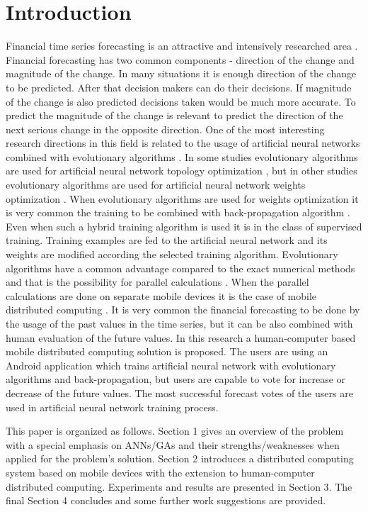 \documentclass[runningheads]{llncs}
\begin{document}
\section{Introduction} \label{Introduction}

Financial time series forecasting is an attractive and intensively researched area \cite{nava01}. Financial forecasting has two common components - direction of the change and magnitude of the change. In many situations it is enough direction of the change to be predicted. After that decision makers can do their decisions. If magnitude of the change is also predicted decisions taken would be much more accurate. To predict the magnitude of the change is relevant to predict the direction of the next serious change in the opposite direction. One of the most interesting research directions in this field is related to the usage of artificial neural networks combined with evolutionary algorithms \cite{zhang01}. In some studies evolutionary algorithms are used for artificial neural network topology optimization \cite{kapanova01}, but in other studies evolutionary algorithms are used for artificial neural network weights optimization \cite{aljarah01}. When evolutionary algorithms are used for weights optimization it is very common the training to be combined with back-propagation algorithm \cite{balabanov02}. Even when such a hybrid training algorithm is used it is in the class of supervised training. Training examples are fed to the artificial neural network and its weights are modified according the selected training algorithm. Evolutionary algorithms have a common advantage compared to the exact numerical methods and that is the possibility for parallel calculations \cite{altinoz01}. When the parallel calculations are done on separate mobile devices it is the case of mobile distributed computing \cite{sharma01}. It is very common the financial forecasting to be done by the usage of the past values in the time series, but it can be also combined with human evaluation of the future values. In this research a human-computer based mobile distributed computing solution is proposed. The users are using an Android application which trains artificial neural network with evolutionary algorithms and back-propagation, but users are capable to vote for increase or decrease of the future values. The most successful forecast votes of the users are used in artificial neural network training process.

This paper is organized as follows. Section 1 gives an overview of the problem  with a special emphasis on ANNs/GAs and their strengths/weaknesses when applied for the problem's solution. Section 2 introduces a distributed computing system based on mobile devices with the extension to human-computer distributed computing. Experiments and results are presented in Section 3. The final Section 4 concludes and some further work suggestions are provided. 
\end{document}
